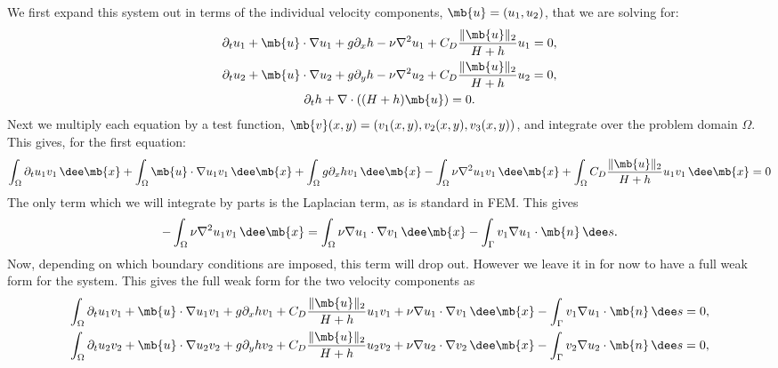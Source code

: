 \documentclass[11pt]{article}
\begin{document}
We first expand this system out in terms of the individual velocity components,
$\mb{u} = (u_1, u_2)$, that we are solving for:
\begin{gather*}
  \partial_t u_1 + \mb{u} \cdot \nabla u_1 + g \partial_x h - \nu \nabla^2 u_1 + C_D
  \frac{\lVert \mb{u} \rVert_2}{H + h} u_1 = 0, \\
  \partial_t u_2 + \mb{u} \cdot \nabla u_2 + g \partial_y h - \nu \nabla^2 u_2 + C_D
  \frac{\lVert \mb{u} \rVert_2}{H + h} u_2 = 0, \\
  \partial_t h + \nabla \cdot \left( (H + h) \mb{u} \right) = 0.
\end{gather*}
Next we multiply each equation by a test function, $\mb{v}(x, y) =
(v_1(x, y), v_2(x, y), v_3(x, y))$, and integrate over the problem domain
$\Omega$. This gives, for the first equation:
\begin{gather*}
  \int_\Omega \partial_t u_1 v_1 \, \dee \mb{x}
  + \int_\Omega \mb{u} \cdot \nabla u_1 v_1 \, \dee \mb{x}
  + \int_\Omega g \partial_x h v_1 \, \dee \mb{x}
  - \int_\Omega \nu \nabla^2 u_1 v_1 \, \dee \mb{x}
  + \int_\Omega C_D \frac{\lVert \mb{u} \rVert_2}{H + h} u_1 v_1 \, \dee \mb{x} = 0
\end{gather*}
The only term which we will integrate by parts is the Laplacian term, as is
standard in FEM. This gives
\begin{gather*}
  - \int_\Omega \nu \nabla^2 u_1 v_1 \, \dee \mb{x}
  = \int_\Omega \nu \nabla u_1 \cdot \nabla v_1 \, \dee \mb{x}
  - \int_\Gamma v_1 \nabla u_1 \cdot \mb{n} \, \dee s.
\end{gather*}
Now, depending on which boundary conditions are imposed, this term will drop out.
However we leave it in for now to have a full weak form for the system. This
gives the full weak form for the two velocity components as
\begin{gather*}
  \int_\Omega
  \partial_t u_1 v_1 +  \mb{u} \cdot \nabla u_1 v_1 +  g \partial_x h v_1
  + C_D \frac{\lVert \mb{u} \rVert_2}{H + h} u_1 v_1
  + \nu \nabla u_1 \cdot \nabla v_1 \, \dee \mb{x}
  - \int_\Gamma v_1 \nabla u_1 \cdot \mb{n} \, \dee s = 0, \\
  \int_\Omega \partial_t u_2 v_2 +  \mb{u} \cdot \nabla u_2 v_2 +  g \partial_y h v_2
  + C_D \frac{\lVert \mb{u} \rVert_2}{H + h} u_2 v_2
  + \nu \nabla u_2 \cdot \nabla v_2 \, \dee \mb{x}
  - \int_\Gamma v_2 \nabla u_2 \cdot \mb{n} \, \dee s = 0, \\
\end{gather*}
\end{document}
